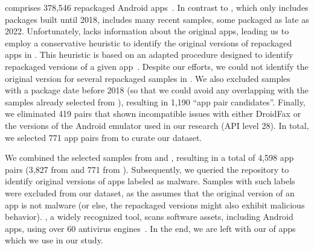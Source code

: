\amc comprises 378,546 repackaged Android apps~\cite{andromalpack}. In contrast to \repack,
which only includes packages built until 2018, \amc includes many recent samples, some packaged as late as 2022.
Unfortunately, \amc lacks information about the original apps, leading us to employ a conservative heuristic
to identify the original versions of repackaged apps in \amc. This heuristic is based on an adapted
procedure designed to identify repackaged versions of a given app~\cite{DBLP:journals/percom/MerloRSV21}.
Despite our efforts, we could not identify the original version for several repackaged samples in \amc.
We also excluded samples with a package date before 2018 (so that we could avoid any overlapping with
the samples already selected from \repack), resulting in 1,190 ``app pair candidates''.
Finally, we eliminated 419 pairs that shown incompatible issues with either DroidFax or the versions of the Android
emulator used in our research (API level 28). In total, we selected 771 app pairs from \amc to curate our dataset.


We combined the selected samples from \repack and \amc, resulting in a total of 4,598 app
pairs (3,827 from \repack and 771 from \amc). Subsequently, we queried the \vt repository
to identify original versions of apps labeled as malware. Samples with such labels were excluded from our dataset,
as the \mas assumes that the original version of an app is not malware (or else, the repackaged versions might
also exhibit malicious behavior). \vt, a widely recognized tool, scans software assets, including Android apps,
using over 60 antivirus engines~\cite{DBLP:journals/ese/KhanmohammadiEH19}. In the end, we are left with our \cds of \apps apps which we use in our study.

